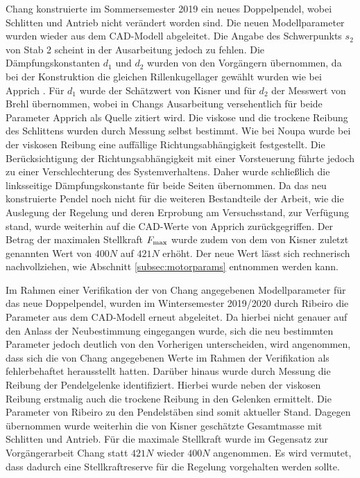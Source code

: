 Chang \cite{chang} konstruierte im Sommersemester 2019 ein neues Doppelpendel, wobei Schlitten und Antrieb nicht verändert worden sind. Die neuen Modellparameter wurden wieder aus dem CAD-Modell abgeleitet. Die Angabe des Schwerpunkts $s_2$ von Stab 2 scheint in der Ausarbeitung jedoch zu fehlen. Die Dämpfungskonstanten $d_1$ und $d_2$ wurden von den Vorgängern übernommen, da bei der Konstruktion die gleichen Rillenkugellager gewählt wurden wie bei Apprich \cite{apprich}. Für $d_1$ wurde der Schätzwert von Kisner \cite{kisner} und für $d_2$ der Messwert von Brehl \cite{brehl} übernommen, wobei in Changs Ausarbeitung versehentlich für beide Parameter Apprich \cite{apprich} als Quelle zitiert wird. Die viskose und die trockene Reibung des Schlittens wurden durch Messung selbst bestimmt. Wie bei Noupa \cite{noupa} wurde bei der viskosen Reibung eine auffällige Richtungsabhängigkeit festgestellt. Die Berücksichtigung der Richtungsabhängigkeit mit einer Vorsteuerung führte jedoch zu einer Verschlechterung des Systemverhaltens. Daher wurde schließlich die linksseitige Dämpfungskonstante für beide Seiten übernommen. Da das neu konstruierte Pendel noch nicht für die weiteren Bestandteile der Arbeit, wie die Auslegung der Regelung und deren Erprobung am Versuchsstand, zur Verfügung stand, wurde weiterhin auf die CAD-Werte von Apprich \cite{apprich} zurückgegriffen. Der Betrag der maximalen Stellkraft $F_{\mathrm{max}}$ wurde zudem von dem von Kisner \cite{kisner} zuletzt genannten Wert von $400 N$ auf $421 N$ erhöht. Der neue Wert lässt sich rechnerisch nachvollziehen, wie Abschnitt \ref{subsec:motorparams} entnommen werden kann.

Im Rahmen einer Verifikation der von Chang \cite{chang} angegebenen Modellparameter für das neue Doppelpendel, wurden im Wintersemester 2019/2020 durch Ribeiro \cite{ribeiro} die Parameter aus dem CAD-Modell erneut abgeleitet. Da hierbei nicht genauer auf den Anlass der Neubestimmung eingegangen wurde, sich die neu bestimmten Parameter jedoch deutlich von den Vorherigen unterscheiden, wird angenommen, dass sich die von Chang \cite{chang} angegebenen Werte im Rahmen der Verifikation als fehlerbehaftet herausstellt hatten. 
Darüber hinaus wurde durch Messung die Reibung der Pendelgelenke identifiziert. Hierbei wurde neben der viskosen Reibung erstmalig auch die trockene Reibung in den Gelenken ermittelt. Die Parameter von Ribeiro \cite{ribeiro} zu den Pendelstäben sind somit aktueller Stand. Dagegen übernommen wurde weiterhin die von Kisner \cite{kisner} geschätzte Gesamtmasse mit Schlitten und Antrieb. Für die maximale Stellkraft wurde im Gegensatz zur Vorgängerarbeit Chang \cite{chang} statt $421 N$ wieder $400 N$ angenommen. Es wird vermutet, dass dadurch eine Stellkraftreserve für die Regelung vorgehalten werden sollte.

